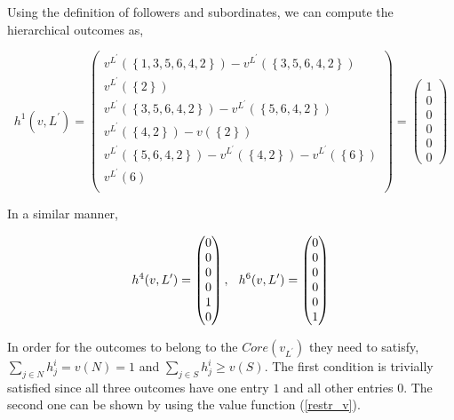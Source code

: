 \documentclass[american]{scrartcl}
\newcommand{\set}[1]{\left\{#1\right\}}
\begin{document}
Using the definition of followers and subordinates, we can compute the hierarchical outcomes as,

\begin{equation}
    h^1(v, L^\prime) = \begin{pmatrix}
        v^{L^\prime}(\set{1, 3, 5, 6, 4, 2}) - v^{L^\prime}(\set{3, 5, 6, 4, 2})          \\
        v^{L^\prime}(\set{2})                                                             \\
        v^{L^\prime}(\set{3, 5, 6, 4, 2}) - v^{L^\prime}(\set{5, 6, 4, 2})                \\
        v^{L^\prime}(\set{4, 2}) - v(\set{2})                                             \\
        v^{L^\prime}(\set{5, 6, 4, 2}) - v^{L^\prime}(\set{4, 2}) - v^{L^\prime}(\set{6}) \\
        v^{L^\prime}(6)                                                                   \\
    \end{pmatrix} = \begin{pmatrix}
        1 \\ 0 \\ 0 \\ 0 \\ 0 \\ 0
    \end{pmatrix}
\end{equation}

In a similar manner,

\begin{equation}
    h^4(v, L^\prime) = \begin{pmatrix}
        0 \\ 0 \\ 0 \\ 0 \\ 1 \\ 0
    \end{pmatrix}, \hspace{0.25cm}
    h^6(v, L^\prime) = \begin{pmatrix}
        0 \\ 0 \\ 0 \\ 0 \\ 0 \\ 1
    \end{pmatrix}
\end{equation}

In order for the outcomes to belong to the $Core(v_{L^\prime})$ they need to satisfy, $\sum_{j \in N} h_j^i = v(N) = 1$ and $\sum_{j \in S}  h_j^i \geq v(S)$. The first condition is trivially satisfied since all three outcomes have one entry $1$ and all other entries $0$. The second one can be shown by using the value function (\ref{restr_v}).
\end{document}
